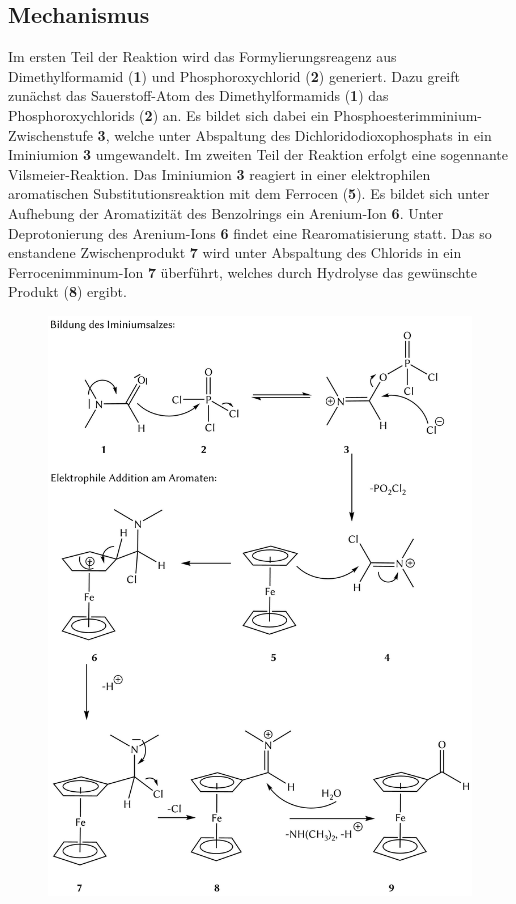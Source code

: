 \documentclass[12pt]{article}
\begin{document}
\begin{onehalfspace}
\section{Mechanismus\cite{mech}\cite{mech2}}
Im ersten Teil der Reaktion wird das Formylierungsreagenz aus Dimethylformamid (\textbf{1}) und Phosphoroxychlorid (\textbf{2}) generiert.
Dazu greift zunächst das Sauerstoff-Atom des Dimethylformamids (\textbf{1}) das Phosphoroxychlorids (\textbf{2}) an.
Es bildet sich dabei ein Phosphoesterimminium-Zwischenstufe \textbf{3}, welche unter Abspaltung des Dichloridodioxophosphats in ein Iminiumion \textbf{3} umgewandelt.
Im zweiten Teil der Reaktion erfolgt eine sogennante Vilsmeier-Reaktion.
Das Iminiumion \textbf{3} reagiert in einer elektrophilen aromatischen Substitutionsreaktion mit dem Ferrocen (\textbf{5}).
Es bildet sich unter Aufhebung der Aromatizität des Benzolrings ein Arenium-Ion \textbf{6}.  
Unter Deprotonierung des Arenium-Ions \textbf{6} findet eine Rearomatisierung statt. Das so enstandene Zwischenprodukt \textbf{7}
wird unter Abspaltung des Chlorids in ein Ferrocenimminum-Ion \textbf{7} überführt, welches durch Hydrolyse das gewünschte Produkt (\textbf{8}) ergibt. 
\newpage
\begin{figure}[!ht]
   \centering
\includegraphics[width=\textwidth]{mechan.png}
\end{figure}

\end{onehalfspace}
\end{document}
